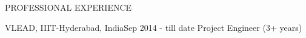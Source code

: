 \documentclass{resume} %
\begin{document}
\begin{rSection}{PROFESSIONAL EXPERIENCE}

   \begin{rSubsection}
    {VLEAD, IIIT-Hyderabad, India}{Sep 2014 - till date}
    {Project Engineer} {(3+ years)}

      



      
      

      

\end{rSubsection}
\end{rSection}
\end{document}
